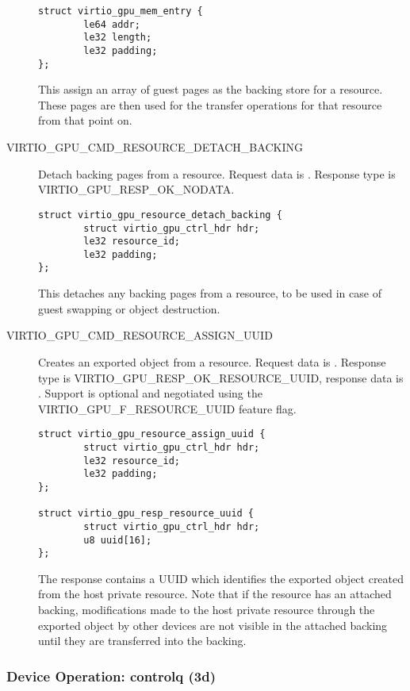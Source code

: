 \begin{description}
\begin{lstlisting}
struct virtio_gpu_mem_entry {
        le64 addr;
        le32 length;
        le32 padding;
};
\end{lstlisting}

This assign an array of guest pages as the backing store for a
resource. These pages are then used for the transfer operations for
that resource from that point on.

\item[VIRTIO_GPU_CMD_RESOURCE_DETACH_BACKING] Detach backing pages
  from a resource.  Request data is .  Response type is
  VIRTIO_GPU_RESP_OK_NODATA.

\begin{lstlisting}
struct virtio_gpu_resource_detach_backing {
        struct virtio_gpu_ctrl_hdr hdr;
        le32 resource_id;
        le32 padding;
};
\end{lstlisting}

This detaches any backing pages from a resource, to be used in case of
guest swapping or object destruction.

\item[VIRTIO_GPU_CMD_RESOURCE_ASSIGN_UUID] Creates an exported object from
  a resource. Request data is .  Response type is
  VIRTIO_GPU_RESP_OK_RESOURCE_UUID, response data is . Support is optional and negotiated
    using the VIRTIO_GPU_F_RESOURCE_UUID feature flag.

\begin{lstlisting}
struct virtio_gpu_resource_assign_uuid {
        struct virtio_gpu_ctrl_hdr hdr;
        le32 resource_id;
        le32 padding;
};

struct virtio_gpu_resp_resource_uuid {
        struct virtio_gpu_ctrl_hdr hdr;
        u8 uuid[16];
};
\end{lstlisting}

The response contains a UUID which identifies the exported object created from
the host private resource. Note that if the resource has an attached backing,
modifications made to the host private resource through the exported object by
other devices are not visible in the attached backing until they are transferred
into the backing.

\end{description}

\subsubsection{Device Operation: controlq (3d)}\label{sec:Device Types / GPU Device / Device Operation / Device Operation: controlq (3d)}

